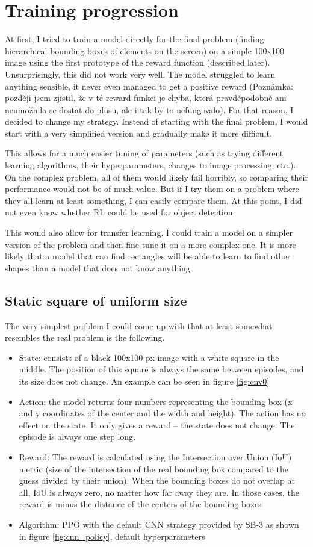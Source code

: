 \documentclass[
  digital,     %
  oneside,     %
  nosansbold,  %
  nocolorbold, %
  lof,         %
  lot,         %
]{fithesis4}
\begin{document}
\section{Training progression}
At first, I tried to train a model directly for the final problem (finding hierarchical bounding boxes of elements on the screen) on a simple 100x100 image using the first prototype of the reward function (described later). Unsurprisingly, this did not work very well. The model struggled to learn anything sensible, it never even managed to get a positive reward (Poznámka: později jsem zjistil, že v té reward funkci je chyba, která pravděpodobně ani neumožnila se dostat do plusu, ale i tak by to nefungovalo). For that reason, I decided to change my strategy. Instead of starting with the final problem, I would start with a very simplified version and gradually make it more difficult.

This allows for a much easier tuning of parameters (such as trying different learning algorithms, their hyperparameters, changes to image processing, etc.). On the complex problem, all of them would likely fail horribly, so comparing their performance would not be of much value. But if I try them on a problem where they all learn at least something, I can easily compare them. At this point, I did not even know whether RL could be used for object detection.

This would also allow for transfer learning. I could train a model on a simpler version of the problem and then fine-tune it on a more complex one. It is more likely that a model that can find rectangles will be able to learn to find other shapes than a model that does not know anything.

\subsection{Static square of uniform size}
The very simplest problem I could come up with that at least somewhat resembles the real problem is the following.
\begin{itemize}
    \item State: consists of a black 100x100 px image with a white square in the middle. The position of this square is always the same between episodes, and its size does not change. An example can be seen in figure \ref{fig:env0}
    \item Action: the model returns four numbers representing the bounding box (x and y coordinates of the center and the width and height). The action has no effect on the state. It only gives a reward -- the state does not change. The episode is always one step long.
    \item Reward: The reward is calculated using the Intersection over Union (IoU) metric (size of the intersection of the real bounding box compared to the guess divided by their union). When the bounding boxes do not overlap at all, IoU is always zero, no matter how far away they are. In those cases, the reward is minus the distance of the centers of the bounding boxes
    \item Algorithm: PPO with the default CNN strategy provided by SB-3 as shown in figure \ref{fig:cnn_policy}, default hyperparameters
\end{itemize}
\end{document}
